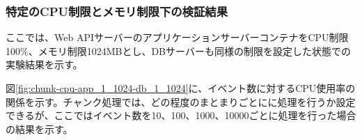 \documentclass[../../../../main]{subfiles}
\begin{document}
    \subsubsection{特定のCPU制限とメモリ制限下の検証結果}\label{subsubsec:result-chunk-only-limit}

    ここでは、Web APIサーバーのアプリケーションサーバーコンテナをCPU制限100\%、メモリ制限1024MBとし、DBサーバーも同様の制限を設定した状態での実験結果を示す。

    \label{subsubsubsec:result-chunk-only-limit-cpu}

    図\ref{fig:chunk-cpu-app_1_1024-db_1_1024}に、イベント数に対するCPU使用率の関係を示す。チャンク処理では、どの程度のまとまりごとにに処理を行うか設定できるが、ここではイベント数を10、100、1000、10000ごとに処理を行った場合の結果を示す。

    
\end{document}
